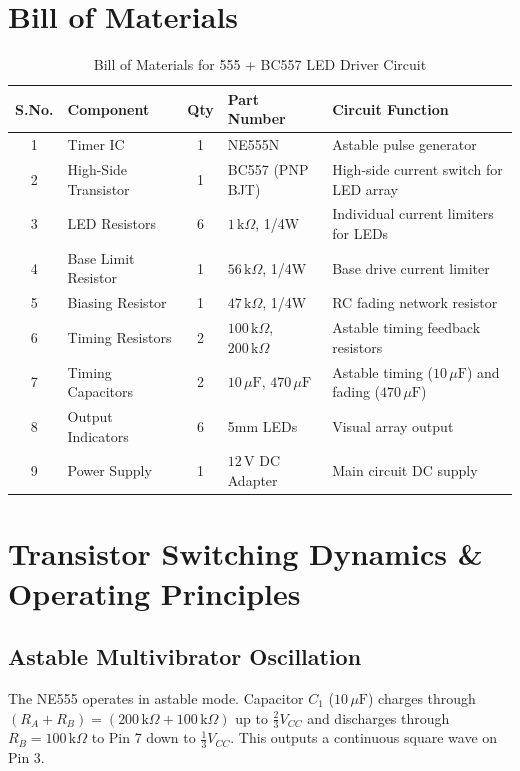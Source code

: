 \documentclass[11pt,a4paper]{article}
\begin{document}
\section{Bill of Materials}
\begin{table}[h!]
\centering
\caption{Bill of Materials for 555 + BC557 LED Driver Circuit}
\vspace{0.5em}
\begin{tabular}{@{}c l c l p{6cm}@{}}
\toprule
\textbf{S.No.} & \textbf{Component} & \textbf{Qty} & \textbf{Part Number} & \textbf{Circuit Function} \\
\midrule
1 & Timer IC & 1 & NE555N & Astable pulse generator \\
2 & High-Side Transistor & 1 & BC557 (PNP BJT) & High-side current switch for LED array \\
3 & LED Resistors & 6 & $1\,\text{k}\Omega$, 1/4W & Individual current limiters for LEDs \\
4 & Base Limit Resistor & 1 & $56\,\text{k}\Omega$, 1/4W & Base drive current limiter \\
5 & Biasing Resistor & 1 & $47\,\text{k}\Omega$, 1/4W & RC fading network resistor \\
6 & Timing Resistors & 2 & $100\,\text{k}\Omega$, $200\,\text{k}\Omega$ & Astable timing feedback resistors \\
7 & Timing Capacitors & 2 & $10\,\mu\text{F}$, $470\,\mu\text{F}$ & Astable timing ($10\,\mu\text{F}$) and fading ($470\,\mu\text{F}$) \\
8 & Output Indicators & 6 & 5mm LEDs & Visual array output \\
9 & Power Supply & 1 & $12\,\text{V}$ DC Adapter & Main circuit DC supply \\
\bottomrule
\end{tabular}
\end{table}

\section{Transistor Switching Dynamics \& Operating Principles}

\subsection{Astable Multivibrator Oscillation}
The NE555 operates in astable mode. Capacitor $C_1$ ($10\,\mu\text{F}$) charges through $(R_A + R_B) = (200\,\text{k}\Omega + 100\,\text{k}\Omega)$ up to $\frac{2}{3}V_{CC}$ and discharges through $R_B = 100\,\text{k}\Omega$ to Pin 7 down to $\frac{1}{3}V_{CC}$. This outputs a continuous square wave on Pin 3.
\end{document}
